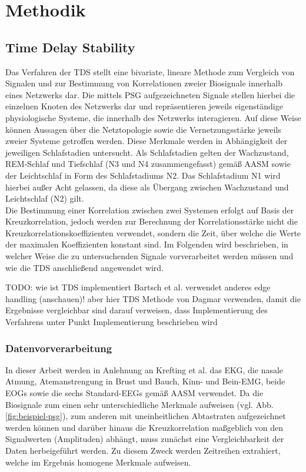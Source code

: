 \chapter{Methodik}

\section{Time Delay Stability}\label{TDS}

Das Verfahren der \acs{TDS} stellt eine bivariate, lineare Methode zum Vergleich von Signalen und zur Bestimmung von Korrelationen zweier Biosignale innerhalb eines Netzwerks dar. Die mittels \acs{PSG} aufgezeichneten Signale stellen hierbei die einzelnen Knoten des Netzwerks dar und repräsentieren jeweils eigenständige physiologische Systeme, die innerhalb des Netzwerks interagieren. Auf diese Weise können Aussagen über die Netztopologie sowie die Vernetzungsstärke jeweils zweier Systeme getroffen werden. Diese Merkmale werden in Abhängigkeit der jeweiligen Schlafstadien untersucht. Als Schlafstadien gelten der Wachzustand, \acs{REM}-Schlaf und Tiefschlaf (N3 und N4 zusammengefasst) gemäß \acs{AASM} sowie der Leichtschlaf in Form des Schlafstadiums N2. Das Schlafstadium N1 wird hierbei außer Acht gelassen, da diese als Übergang zwischen Wachzustand und Leichtschlaf (N2) gilt. \parencite{bashan_network_2012, iber_aasm_2007}\\

Die Bestimmung einer Korrelation zwischen zwei Systemen erfolgt auf Basis der Kreuzkorrelation, jedoch werden zur Berechnung der Korrelationsstärke nicht die Kreuzkorrelationskoeffizienten verwendet, sondern die Zeit, über welche die Werte der maximalen Koeffizienten konstant sind. Im Folgenden wird beschrieben, in welcher Weise die zu untersuchenden Signale vorverarbeitet werden müssen und wie die \acs{TDS} anschließend angewendet wird.

TODO:
wie ist TDS implementiert
Bartsch et al. verwendet anderes edge handling (anschauen)! aber hier TDS Methode von Dagmar verwenden, damit die Ergebnisse vergleichbar sind
darauf verweisen, dass Implementierung des Verfahrens unter Punkt Implementierung beschrieben wird

\subsection{Datenvorverarbeitung}

In dieser Arbeit werden in Anlehnung an Krefting et al. das \acs{EKG}, die nasale Atmung, Atemanstrengung in Brust und Bauch, Kinn- und Bein-\acs{EMG}, beide \acs{EOG}s sowie die sechs Standard-\acs{EEG}s gemäß \acs{AASM} verwendet. Da die Biosignale zum einen sehr unterschiedliche Merkmale aufweisen (vgl. Abb. \ref{fig:beispiel-psg}), zum anderen mit uneinheitlichen Abtastraten aufgezeichnet werden können und darüber hinaus die Kreuzkorrelation maßgeblich von den Signalwerten (Amplituden) abhängt, muss zunächst eine Vergleichbarkeit der Daten herbeigeführt werden. Zu diesem Zweck werden Zeitreihen extrahiert, welche im Ergebnis homogene Merkmale aufweisen.


